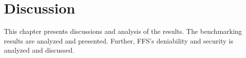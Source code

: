 
\chapter{Discussion}
\label{ch:discussion}
This chapter presents discussions and analysis of the results. The benchmarking results are analyzed and presented. Further, FFS's deniability and security is analyzed and discussed.


